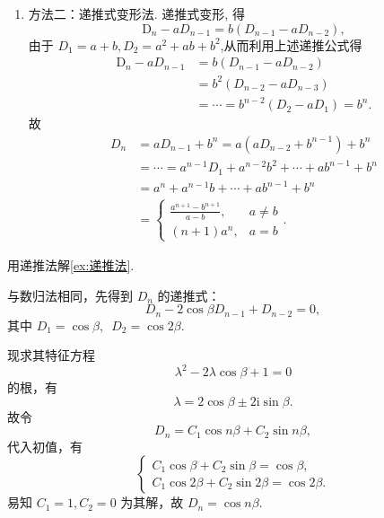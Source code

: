 \begin{exercise}
\begin{exgroup}
\begin{answer}
\begin{enumerate}
                \item 方法二：递推式变形法. 递推式变形, 得
                        \[\mathrm{D}_{n}-a D_{n-1}=b\left(D_{n-1}-a D_{n-2}\right),\]
                        由于 $D_{1}=a+b, D_{2}=a^{2}+a b+b^{2}$,从而利用上述递推公式得
                        \begin{align*}
                            \mathrm{D}_{n}-a D_{n-1} & =b\left(D_{n-1}-a D_{n-2}\right)                \\
                                                    & =b^{2}\left(D_{n-2}-a D_{n-3}\right)            \\
                                                    & =\cdots=b^{n-2}\left(D_{2}-a D_{1}\right)=b^{n}.
                        \end{align*}
                        故\begin{align*}
                            D_{n} & =a D_{n-1}+b^{n}=a\left(a D_{n-2}+b^{n-1}\right)+b^{n}     \\
                                  & =\cdots=a^{n-1} D_{1}+a^{n-2} b^{2}+\cdots+a b^{n-1}+b^{n} \\
                                  & =a^{n}+a^{n-1} b+\cdots+a b^{n-1}+b^{n}                    \\
                                  & =\begin{cases}
                                        \displaystyle\frac{a^{n+1}-b^{n+1}}{a-b}, & a\neq b \\
                                        (n+1)a^n,                                 & a=b
                                     \end{cases}.
                        \end{align*}
            \end{enumerate}
        \end{answer}

        \item 用递推法解\autoref{ex:递推法}.
        \begin{answer}
            与数归法相同，先得到 $D_n$ 的递推式：
            \[
                D_n - 2 \cos \beta D_{n-1} + D_{n-2} = 0,
            \]
            其中 $D_1 = \cos \beta, \enspace D_2 = \cos 2\beta$.

            现求其特征方程
            \[
                \lambda^2 - 2 \lambda \cos \beta + 1 = 0
            \]
            的根，有
            \[
                \lambda = 2 \cos \beta \pm 2 \mathrm{i} \sin \beta.
            \]
            故令
            \[
                D_n = C_1 \cos n\beta + C_2 \sin n\beta,
            \]
            代入初值，有
            \[
                \begin{cases}
                    C_1 \cos \beta + C_2 \sin \beta = \cos \beta, \\
                    C_1 \cos 2\beta + C_2 \sin 2\beta = \cos 2\beta.
                \end{cases}
            \]
            易知 $C_1 = 1, C_2 = 0$ 为其解，故 $D_n = \cos n\beta$.
        \end{answer}


\end{exgroup}
\end{exercise}
